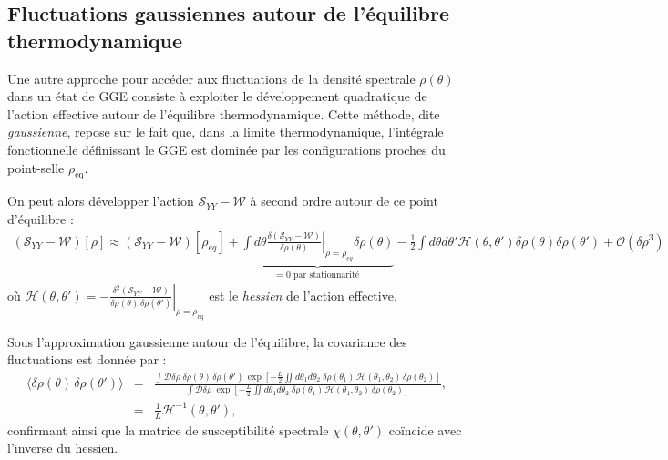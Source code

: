 \subsection{Fluctuations gaussiennes autour de l’équilibre thermodynamique}

Une autre approche pour accéder aux fluctuations de la densité spectrale $\rho(\theta)$ dans un état de GGE consiste à exploiter le développement quadratique de l’action effective autour de l’équilibre thermodynamique. Cette méthode, dite \emph{gaussienne}, repose sur le fait que, dans la limite thermodynamique, l’intégrale fonctionnelle définissant le GGE est dominée par les configurations proches du point-selle $\rho_{\mathrm{eq}}$.

On peut alors développer l’action $\mathcal{S}_{YY} - \mathcal{W}$ à second ordre autour de ce point d'équilibre :
\begin{eqnarray*}
	(\mathcal{S}_{YY} - \mathcal{W})[\rho] \approx (\mathcal{S}_{YY} - \mathcal{W})[\rho_{eq}]  + \underbrace{\int d\theta \left . \frac{ \delta (\mathcal{S}_{YY} - \mathcal{W})}{\delta \rho (\theta) }  \right\vert_{\rho = \rho_{eq} } \delta \rho(\theta)}_{\text{= 0 par stationnarité}} - \frac{1}{2} \int d\theta d \theta'\mathcal{H}(\theta, \theta' )\delta \rho(\theta)\delta \rho(\theta') + \mathcal{O}(\delta \rho^3) 
\end{eqnarray*}
où
\(
\displaystyle \mathcal{H}(\theta, \theta' ) = -\left.\frac{\delta^{2}(\mathcal{S}_{YY}-\mathcal{W})}{\delta\rho(\theta)\,\delta\rho(\theta')}\right|_{\rho = \rho_{\mathrm{eq}}}
\)
est le \textit{hessien} de l’action effective.

Sous l’approximation gaussienne autour de l'équilibre, la covariance des fluctuations est donnée par :
\begin{eqnarray}
\langle \delta \rho(\theta) \, \delta \rho(\theta') \rangle &=& \frac{
 \displaystyle \int \mathcal{D} \delta \rho \; \delta \rho(\theta) \, \delta \rho(\theta') 
    \, \exp \left[ 
        -\frac{L}{2} 
        \iint  d \theta_1 d \theta_2 \; 
        \delta \rho(\theta_1) \, \mathcal{H}(\theta_1, \theta_2 )  \, \delta \rho(\theta_2) 
    \right]
}{
    \displaystyle \int \mathcal{D} \delta \rho \; 
    \exp \left[ 
        -\frac{L}{2} 
        \iint  d \theta_1 d \theta_2 \; 
        \delta \rho(\theta_1) \, \mathcal{H}(\theta_1, \theta_2 )  \, \delta \rho(\theta_2) 
    \right]
}, \nonumber \\
&=& \frac{1}{L} \mathcal{H}^{-1}(\theta, \theta' ), \label{eq:fluctuations}
\label{chap:fluctu:eq:fluctuations}
\end{eqnarray}
confirmant ainsi que la matrice de susceptibilité spectrale $\chi(\theta, \theta')$ coïncide avec l’inverse du hessien.

